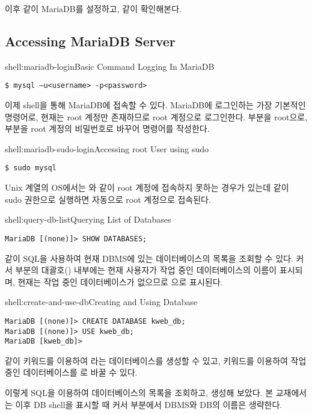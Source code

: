 이후 \와 같이 MariaDB를 설정하고, \와 같이 확인해본다.

\subsection*{Accessing MariaDB Server}

\begin{shellenv}{shell:mariadb-login}{Basic Command Logging In MariaDB}\begin{verbatim}
$ mysql –u<username> -p<password>
\end{verbatim}
\end{shellenv}

이제 shell을 통해 MariaDB에 접속할 수 있다. \은 MariaDB에 로그인하는 가장 기본적인 명령어로, 현재는 root 계정만 존재하므로 root 계정으로 로그인한다.  부분을 root으로,  부분을 root 계정의 비밀번호로 바꾸어 명령어를 작성한다.

\begin{shellenv}{shell:mariadb-sudo-login}{Accessing root User using sudo}\begin{verbatim}
$ sudo mysql
\end{verbatim}
\end{shellenv}

Unix 계열의 OS에서는 와 같이 root 계정에 접속하지 못하는 경우가 있는데 \과 같이 sudo 권한으로 실행하면 자동으로 root 계정으로 접속된다.

\begin{shellenv}{shell:query-db-list}{Querying List of Databases}\begin{verbatim}
MariaDB [(none)]> SHOW DATABASES;
\end{verbatim}
\end{shellenv}

\와 같이 SQL을 사용하여 현재 DBMS에 있는 데이터베이스의 목록을 조회할 수 있다. 커서 부분의 대괄호(\cd{[]}) 내부에는 현재 사용자가 작업 중인 데이터베이스의 이름이 표시되며, 현재는 작업 중인 데이터베이스가 없으므로 으로 표시된다.

\begin{shellenv}{shell:create-and-use-db}{Creating and Using Database}\begin{verbatim}
MariaDB [(none)]> CREATE DATABASE kweb_db;
MariaDB [(none)]> USE kweb_db;
MariaDB [kweb_db]>
\end{verbatim}
\end{shellenv}

\와 같이  키워드를 이용하여 라는 데이터베이스를 생성할 수 있고,  키워드를 이용하여 작업 중인 데이터베이스를 로 바꿀 수 있다.

이렇게 SQL을 이용하여 데이터베이스의 목록을 조회하고, 생성해 보았다. 본 교재에서는 이후 DB shell을 표시할 때 커서 부분에서 DBMS와 DB의 이름은 생략한다.
